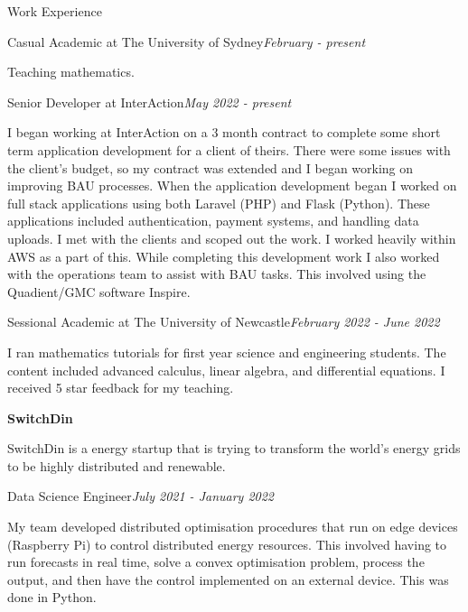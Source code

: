\documentclass{resume} %
\begin{document}
\begin{rSection}{Work Experience}

    \begin{rSubsection}{Casual Academic at The University of Sydney}{\em February - present}{}{}
        \item Teaching mathematics.
    \end{rSubsection}

    \begin{rSubsection}{Senior Developer at InterAction}{\em May 2022 - present}{}{}
        \item I began working at InterAction on a 3 month contract to complete some short term application development for a client of theirs.
        There were some issues with the client's budget, so my contract was extended and I began working on improving BAU processes.
        When the application development began I worked on full stack applications using both Laravel (PHP) and Flask (Python).
        These applications included authentication, payment systems, and handling data uploads.
        I met with the clients and scoped out the work. I worked heavily within AWS as a part of this.
        While completing this development work I also worked with the operations team to assist with BAU tasks.
        This involved using the Quadient/GMC software Inspire.
    \end{rSubsection}

    \begin{rSubsection}{Sessional Academic at The University of Newcastle}{\em February 2022 - June 2022}{}{}
        \item I ran mathematics tutorials for first year science and engineering students.
        The content included advanced calculus, linear algebra, and differential equations. I received 5 star feedback for my teaching.
    \end{rSubsection}

    {\bf SwitchDin}

    SwitchDin is a energy startup that is trying to transform the world's energy grids to be highly
    distributed and renewable.

    \begin{adjustwidth}{2em}{}
        \begin{rSubsection}{Data Science Engineer}{\em July 2021 - January 2022}{}{}
            \item My team developed distributed optimisation procedures that run on edge devices (Raspberry Pi) to control
            distributed energy resources. This involved having to run forecasts in real time, solve a convex optimisation problem, process the output, and
            then have the control implemented on an external device. This was done in Python.
        \end{rSubsection}


\end{adjustwidth}
\end{rSection}
\end{document}
